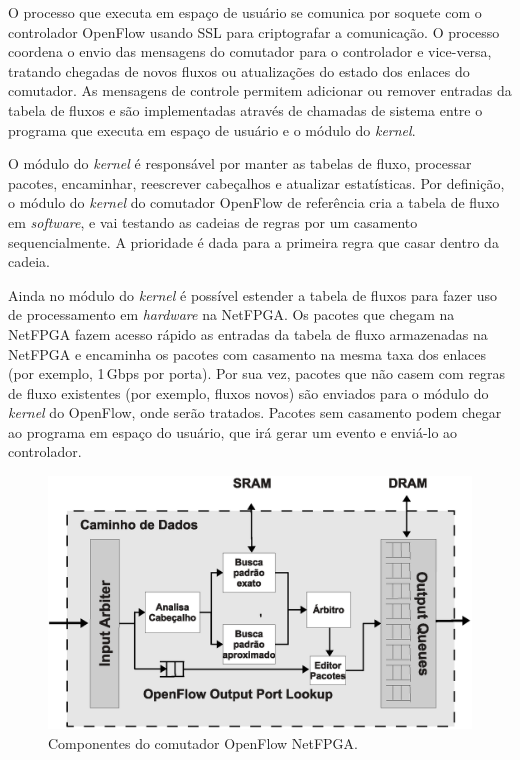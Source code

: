 O processo que executa em espaço de usuário se comunica por soquete com
o controlador OpenFlow usando SSL para criptografar a comunicação.  O
processo coordena o envio das mensagens do comutador para o controlador
e vice-versa, tratando chegadas de novos fluxos ou atualizações do
estado dos enlaces do comutador. As mensagens de controle permitem
adicionar ou remover entradas da tabela de fluxos e são implementadas
através de chamadas de sistema  entre o programa que executa
em espaço de usuário e o módulo do \emph{kernel}.

O módulo do \emph{kernel} é responsável por manter as tabelas de fluxo,
processar pacotes, encaminhar, reescrever cabeçalhos e atualizar
estatísticas.  Por definição, o módulo do \emph{kernel} do comutador
OpenFlow de referência cria a tabela de fluxo em \emph{software}, e vai
testando as cadeias de regras por um casamento sequencialmente. A
prioridade é dada para a primeira regra que casar dentro da cadeia.

Ainda no módulo do \emph{kernel} é possível estender a tabela de fluxos
para fazer uso de processamento em \textit{hardware} na NetFPGA.  Os
pacotes que chegam na NetFPGA fazem acesso rápido as entradas da tabela
de fluxo armazenadas na NetFPGA e encaminha os pacotes com casamento na
mesma taxa dos enlaces (por exemplo, 1\,Gbps por porta). Por sua vez,
pacotes que não casem com regras de fluxo existentes (por exemplo,
fluxos novos) são enviados para o módulo do \emph{kernel} do OpenFlow,
onde serão tratados.  Pacotes sem casamento podem chegar ao programa em
espaço do usuário, que irá gerar um evento  e enviá-lo ao
controlador.

\begin{figure}[h]
\centering
\includegraphics[scale=0.4]{figures/netfpga-rev/nfopenflow.eps}
\caption{Componentes do comutador OpenFlow NetFPGA.}
\label{fig:nfopenflow}
\end{figure}

